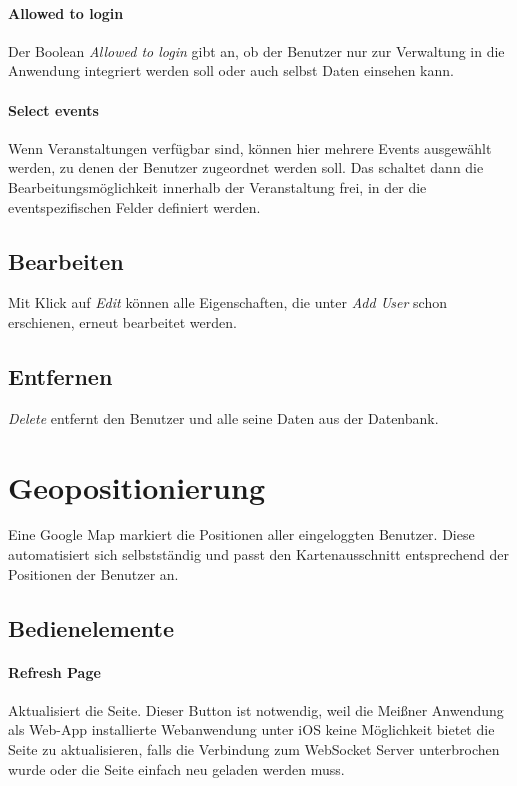 \paragraph{Allowed to login}
Der Boolean \emph{Allowed to login} gibt an, ob der Benutzer nur zur Verwaltung in die Anwendung integriert werden soll oder auch selbst Daten einsehen kann.

\paragraph{Select events}
Wenn Veranstaltungen verfügbar sind, können hier mehrere Events ausgewählt werden, zu denen der Benutzer zugeordnet werden soll. Das schaltet dann die Bearbeitungsmöglichkeit innerhalb der Veranstaltung frei, in der die eventspezifischen Felder definiert werden.

\subsection{Bearbeiten}
Mit Klick auf \emph{Edit} können alle Eigenschaften, die unter \emph{Add User} schon erschienen, erneut bearbeitet werden.

\subsection{Entfernen}
\emph{Delete} entfernt den Benutzer und alle seine Daten aus der Datenbank.


\section{Geopositionierung}
Eine Google Map markiert die Positionen aller eingeloggten Benutzer. Diese automatisiert sich selbstständig und passt den Kartenausschnitt entsprechend der Positionen der Benutzer an.

\subsection{Bedienelemente}
\paragraph{Refresh Page}
Aktualisiert die Seite. Dieser Button ist notwendig, weil die Meißner Anwendung als Web-App installierte Webanwendung unter iOS keine Möglichkeit bietet die Seite zu aktualisieren, falls die Verbindung zum WebSocket Server unterbrochen wurde oder die Seite einfach neu geladen werden muss.

